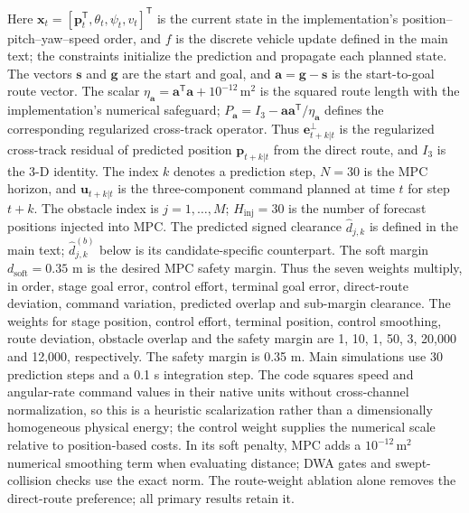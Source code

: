 \documentclass[10pt]{article}
\begin{document}
Here $\mathbf{x}_t=[\mathbf p_t^{\mathsf T},\theta_t,\psi_t,v_t]^{\mathsf T}$ is the current state in the implementation's position--pitch--yaw--speed order, and $f$ is the discrete vehicle update defined in the main text; the constraints initialize the prediction and propagate each planned state. The vectors $\mathbf s$ and $\mathbf g$ are the start and goal, and $\mathbf a=\mathbf g-\mathbf s$ is the start-to-goal route vector. The scalar $\eta_{\mathbf a}=\mathbf a^{\mathsf T}\mathbf a+10^{-12}\,\mathrm m^2$ is the squared route length with the implementation's numerical safeguard; $P_{\mathbf a}=I_3-\mathbf a\mathbf a^{\mathsf T}/\eta_{\mathbf a}$ defines the corresponding regularized cross-track operator. Thus $\mathbf e_{t+k|t}^{\perp}$ is the regularized cross-track residual of predicted position $\mathbf p_{t+k|t}$ from the direct route, and $I_3$ is the 3-D identity. The index $k$ denotes a prediction step, $N=30$ is the MPC horizon, and $\mathbf u_{t+k|t}$ is the three-component command planned at time $t$ for step $t+k$. The obstacle index is $j=1,\ldots,M$; $H_{\mathrm{inj}}=30$ is the number of forecast positions injected into MPC. The predicted signed clearance $\hat d_{j,k}$ is defined in the main text; $\hat d^{(b)}_{j,k}$ below is its candidate-specific counterpart. The soft margin $d_{\mathrm{soft}}=0.35$ m is the desired MPC safety margin. Thus the seven weights multiply, in order, stage goal error, control effort, terminal goal error, direct-route deviation, command variation, predicted overlap and sub-margin clearance.
The weights for stage position, control effort, terminal position, control smoothing, route deviation, obstacle overlap and the safety margin are 1, 10, 1, 50, 3, 20,000 and 12,000, respectively. The safety margin is 0.35 m. Main simulations use 30 prediction steps and a 0.1 s integration step. The code squares speed and angular-rate command values in their native units without cross-channel normalization, so this is a heuristic scalarization rather than a dimensionally homogeneous physical energy; the control weight supplies the numerical scale relative to position-based costs. In its soft penalty, MPC adds a $10^{-12}\,\mathrm m^2$ numerical smoothing term when evaluating distance; DWA gates and swept-collision checks use the exact norm. The route-weight ablation alone removes the direct-route preference; all primary results retain it.
\end{document}
